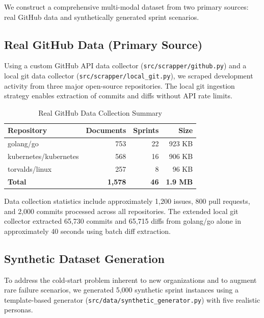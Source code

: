 \documentclass[journal]{IEEEtran}
\begin{document}
We construct a comprehensive multi-modal dataset from two primary sources: real GitHub data and synthetically generated sprint scenarios.

\subsection{Real GitHub Data (Primary Source)}

Using a custom GitHub API data collector (\texttt{src/scrapper/github.py}) and a local git data collector (\texttt{src/scrapper/local\_git.py}), we scraped development activity from three major open-source repositories. The local git ingestion strategy enables extraction of commits and diffs without API rate limits.

\begin{table}[htbp]
\centering
\caption{Real GitHub Data Collection Summary}
\label{tab:real_data}
\begin{tabular}{l|r|r|r}
\toprule
\textbf{Repository} & \textbf{Documents} & \textbf{Sprints} & \textbf{Size} \\
\midrule
golang/go & 753 & 22 & 923 KB \\
kubernetes/kubernetes & 568 & 16 & 906 KB \\
torvalds/linux & 257 & 8 & 96 KB \\
\midrule
\textbf{Total} & \textbf{1,578} & \textbf{46} & \textbf{1.9 MB} \\
\bottomrule
\end{tabular}
\end{table}

Data collection statistics include approximately 1,200 issues, 800 pull requests, and 2,000 commits processed across all repositories. The extended local git collector extracted 65,730 commits and 65,715 diffs from golang/go alone in approximately 40 seconds using batch diff extraction.

\subsection{Synthetic Dataset Generation}

To address the cold-start problem inherent to new organizations and to augment rare failure scenarios, we generated 5,000 synthetic sprint instances using a template-based generator (\texttt{src/data/synthetic\_generator.py}) with five realistic personas.
\end{document}
